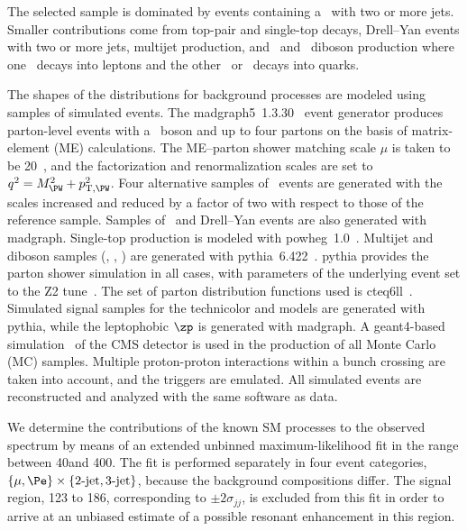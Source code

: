 The selected sample is dominated by events containing a \PW\ with two
or more jets.  Smaller contributions come from top-pair and single-top
decays, Drell--Yan events with two or more jets, multijet production,
and \PW\PW\ and \PW\PZ\ diboson production where one \PW\ decays into
leptons and the other \PW\ or \PZ\ decays into quarks.


The shapes of the \mjj distributions for background processes
are modeled using samples of simulated events. The {\sc
  madgraph}5~1.3.30~\cite{MADGRAPH} event generator produces
parton-level events with a \PW\ boson and up to four partons on the basis
of matrix-element (ME) calculations.  The ME--parton shower matching
scale $\mu$ is taken to be 20\GeV~\cite{Hoche:2006ph}, and the
factorization and renormalization scales are set to $q^2 = M_{\PW}^2 +
p_{\mathrm{T},\PW}^2$.  Four alternative samples of \PW\ events are
generated with the scales increased and reduced by a factor of two
with respect to those of the reference sample.  Samples of \ttbar\ and
Drell--Yan events are also generated with {\sc madgraph}.  Single-top
production is modeled with {\sc powheg}~1.0~\cite{POWHEG}.  Multijet
and diboson samples (\PW\PW, \PW\PZ, \PZ\PZ) are generated with {\sc
  pythia}~6.422~\cite{Sjostrand:2006za}.  {\sc pythia} provides the
parton shower simulation in all cases, with parameters of the
underlying event set to the Z2 tune~\cite{PythiaTuneZ2}.  The set of
parton distribution functions used is {\sc cteq6ll}~\cite{CTEQ}.
Simulated signal samples for the technicolor and \PW\PH models are
generated with {\sc pythia}, while the leptophobic $\zp$ is generated
with {\sc madgraph}.  A {\sc geant4}-based simulation~\cite{GEANT4} of
the CMS detector is used in the production of all Monte Carlo (MC)
samples. Multiple proton-proton interactions within a bunch crossing
are taken into account, and the triggers are emulated.  All simulated
events are reconstructed and analyzed with the same software as data.

We determine the contributions of the known SM processes to the
observed \mjj spectrum by means of an extended unbinned
maximum-likelihood fit in the range between 40\GeV and 400\GeV.  The
fit is performed separately in four event categories,
$\{\mu,\Pe\}\times\{2\text{-jet},3\text{-jet}\}$, because the
background compositions differ.  The \mjj signal region, 123 to
186\GeV, corresponding to ${\pm} 2\sigma_{jj}$, is excluded from this
fit in order to arrive at an unbiased estimate of a possible resonant
enhancement in this region.

